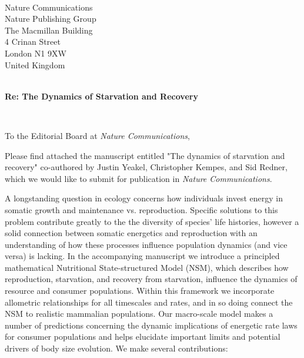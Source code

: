 \documentclass[ucm,12pt]{ucletter}
\begin{document}
\begin{letter}{
    \\ Nature Communications\\
    Nature Publishing Group\\
    The Macmillan Building\\
    4 Crinan Street\\ 
    London N1 9XW\\
    United Kingdom\\ \\
    \vspace{1mm}
    \centerline{\bf{Re: The Dynamics of Starvation and Recovery}} \\
}


\opening{To the Editorial Board at \emph{Nature Communications},}



Please find attached the manuscript entitled "The dynamics of starvation and recovery" co-authored by Justin Yeakel, Christopher Kempes, and Sid Redner, which we would like to submit for publication in \emph{Nature Communications}.

A longstanding question in ecology concerns how individuals invest energy in somatic growth and maintenance vs. reproduction. Specific solutions to this problem contribute greatly to the the diversity of species’ life histories, however a  solid connection between somatic energetics and reproduction with an understanding of how these processes influence population dynamics (and vice versa) is lacking. In the accompanying manuscript we introduce a principled mathematical Nutritional State-structured Model (NSM), which describes how reproduction, starvation, and recovery from starvation, influence the dynamics of resource and consumer populations. Within this framework we incorporate allometric relationships for all timescales and rates, and in so doing connect the NSM to realistic mammalian populations. Our macro-scale model makes a number of predictions concerning the dynamic implications of energetic rate laws for consumer populations and helps elucidate important limits and potential drivers of body size evolution. We make several contributions:




\end{letter}
\end{document}
